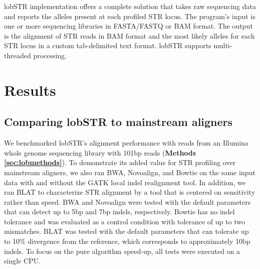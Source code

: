 lobSTR implementation offers a complete solution that takes raw sequencing data and reports the alleles present at each profiled STR locus. The program's input is one or more sequencing libraries in FASTA/FASTQ or BAM format. The output is the alignment of STR reads in BAM format and the most likely alleles for each STR locus in a custom tab-delimited text format. lobSTR supports multi-threaded processing.

\section{Results}
\subsection{Comparing lobSTR to mainstream aligners}

We benchmarked lobSTR's alignment performance with reads from an Illumina whole genome sequencing library with 101bp reads (\textbf{Methods \ref{sec:lobmethods}}). To demonstrate its added value for STR profiling over mainstream aligners, we also ran BWA, Novoalign, and Bowtie on the same input data with and without the GATK local indel realignment tool. In addition, we ran BLAT \cite{Kent2002} to characterize STR alignment by a tool that is centered on sensitivity rather than speed. BWA and Novoalign were tested with the default parameters that can detect up to 5bp and 7bp indels, respectively. Bowtie has no indel tolerance and was evaluated as a control condition with tolerance of up to two mismatches. BLAT was tested with the default parameters that can tolerate up to 10\% divergence from the reference, which corresponds to approximately 10bp indels. To focus on the pure algorithm speed-up, all tests were executed on a single CPU.

